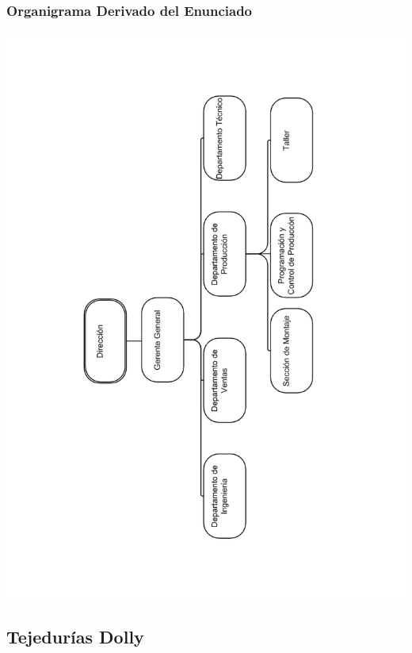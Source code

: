 \documentclass[a4paper,10pt,titlepage]{article}
\begin{document}
\subsubsection{Organigrama Derivado del Enunciado}
\begin{center}
\includegraphics[width=150mm]{./herculesBN.png}
 \end{center}




\newpage
\subsection{Tejedur\'ias Dolly}
\end{document}
